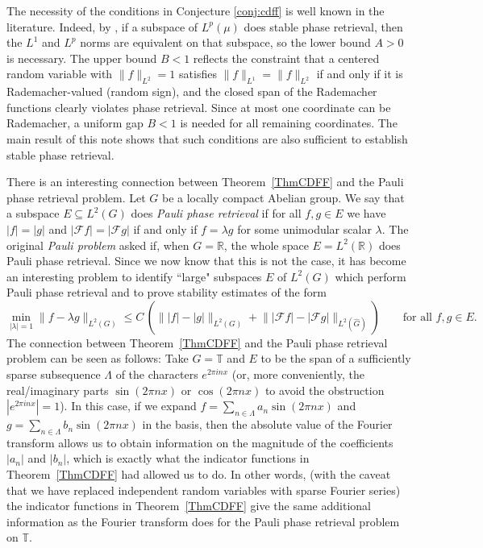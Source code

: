 \documentclass[11pt]{amsart}
\begin{document}
The necessity of the conditions in Conjecture \ref{conj:cdff} is well
known in the literature. Indeed,
by \cite{FOTP}, if a subspace of $L^p(\mu)$
does stable phase retrieval, then the $L^1$ and $L^p$ norms are equivalent on
that subspace, so the lower bound $A>0$ is necessary. The upper bound $B<1$
reflects the constraint that a centered random variable with
$\|f\|_{L^2}=1$ satisfies
$\|f\|_{L^1}=\|f\|_{L^2}$ if and only if it is Rademacher-valued (random sign), and the
closed span of the Rademacher functions clearly violates phase retrieval.
Since at most one coordinate can be Rademacher, a uniform gap $B<1$ is needed
for all remaining coordinates. The main result of this note shows that such conditions are also sufficient to establish stable phase retrieval.


There is an interesting connection between Theorem~\ref{ThmCDFF} and the Pauli phase retrieval problem.
Let $G$ be a locally compact Abelian group. We say that a subspace $E\subseteq L^2(G)$ does \emph{Pauli phase retrieval}
if for all $f,g\in E$ we have $|f|=|g|$ and $|\mathcal{F}f|=|\mathcal{F}g|$ if and only if $f=\lambda g$ for some unimodular
scalar $\lambda$. The original \emph{Pauli problem} asked if, when $G=\mathbb{R}$, the whole space $E=L^2(\mathbb{R})$ does Pauli phase retrieval.
Since we now know that this is not the case, it has become an interesting problem to identify ``large" subspaces $E$ of $L^2(G)$ which perform Pauli phase 
retrieval and to prove stability estimates of the form
\[
\min_{|\lambda|=1} \|f-\lambda g\|_{L^2(G)}
\leq C \, \left(\bigl\||f|-|g|\bigr\|_{L^2(G)}+\bigl\||\mathcal{F}f|-|\mathcal{F}g|\bigr\|_{L^2(\widehat{G})}\right)
\qquad
\text{for all } f,g \in E.
\]
The connection between Theorem~\ref{ThmCDFF} and the Pauli phase retrieval problem can be seen as follows: Take $G=\mathbb{T}$ and $E$ to be the span of a sufficiently sparse subsequence $\Lambda$ of the characters $e^{2\pi i nx}$ (or, more conveniently, the real/imaginary parts $\sin(2\pi nx)$ or $\cos(2\pi nx)$  to avoid the obstruction $|e^{2\pi i nx}|=1$). In this case, if we expand $f=\sum_{n\in \Lambda} a_n \sin(2\pi nx)$ and $g=\sum_{n\in \Lambda} b_n \sin(2\pi nx)$ in the basis, then the absolute value of the Fourier transform allows us to obtain information on the magnitude of the coefficients $|a_n|$ and $|b_n|$, which is exactly what the  indicator functions in Theorem~\ref{ThmCDFF} had allowed us to do.  In other words, (with the caveat that we have replaced independent random variables with sparse Fourier series) the indicator functions in Theorem~\ref{ThmCDFF} give the same additional information as the Fourier transform does for the Pauli phase retrieval problem on $\mathbb{T}$. 
\end{document}
